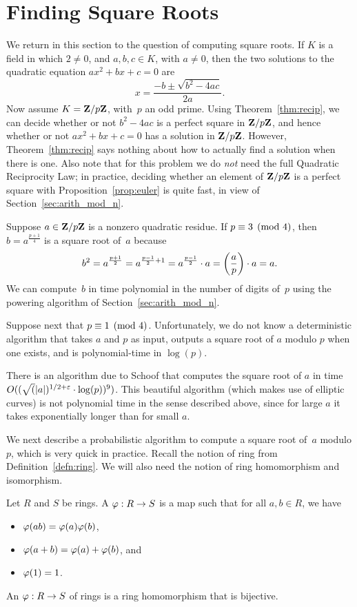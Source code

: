 \section{Finding Square Roots}\label{sec:findingsqrt}
We return in this section to the question of computing square roots.
If $K$ is a field in which $2\neq 0$, and $a,b,c\in K$, with $a\neq 0$,
then
the two solutions to the quadratic equation $ax^2+bx+c=0$ are
$$
x = \frac{-b\pm \sqrt{b^2-4ac}}{2a}.
$$
Now assume $K=\mathbf{Z}/p\mathbf{Z}{}$, with~$p$ an odd prime.  Using
Theorem~\ref{thm:recip}, we can decide whether or not $b^2-4ac$ is a
perfect square in $\mathbf{Z}/p\mathbf{Z}{}$, and hence whether or not $ax^2 + bx+c=0$
has a solution in $\mathbf{Z}/p\mathbf{Z}{}$.  However,
Theorem~\ref{thm:recip} says nothing about how to actually find
a solution when there is one.
Also note that for this problem we do {\em not} need the
full Quadratic Reciprocity Law; in practice,
deciding whether an element of $\mathbf{Z}/p\mathbf{Z}{}$ is
a perfect square with Proposition~\ref{prop:euler} is quite fast,
in view of Section~\ref{sec:arith_mod_n}.

Suppose $a\in \mathbf{Z}/p\mathbf{Z}{}$ is a nonzero quadratic residue.
If $p\equiv 3 \pmod{4}$, then $b=a^{\frac{p+1}{4}}$
is a square root of~$a$ because
$$
  b^2 = a^{\frac{p+1}{2}} = a^{\frac{p-1}{2} + 1}
     = a^{\frac{p-1}{2}} \cdot a
          = \left(\frac{a}{p}\right) \cdot a = a.
$$
We can compute~$b$ in time polynomial in the number of digits of~$p$
using the powering algorithm of Section~\ref{sec:arith_mod_n}.


Suppose next that $p\equiv 1\pmod{4}$.
Unfortunately, we do not know a deterministic algorithm
that takes $a$ and $p$ as input, outputs
a square root of $a$ modulo $p$ when one exists,
and is polynomial-time in $\log(p)$.

\begin{remark}
  There is an algorithm due to Schoof \cite{schoof:sqrt} that computes
  the square root of $a$ in time $O((\sqrt(|a|)^{1/2 + \varepsilon} \cdot
  \log(p))^9)$.  This beautiful algorithm (which makes use of elliptic
  curves) is not polynomial time in the sense described above, since
  for large $a$ it takes exponentially longer than for small $a$.
\end{remark}

We next describe a probabilistic algorithm to
compute a square root of~$a$ modulo $p$, which is very quick
in practice.
Recall the notion of ring from Definition~\ref{defn:ring}.
We will also need the notion of ring homomorphism and isomorphism.
\begin{definition}
Let $R$ and $S$ be rings.
A  $\varphi:R\to S$
is a map such that for all $a,b\in R$, we have
\begin{itemize}
\item $\varphi(ab) =\varphi(a)\varphi(b)$,
\item $\varphi(a+b) = \varphi(a) + \varphi(b)$, and
\item $\varphi(1) = 1$.
\end{itemize}
An  $\varphi:R\to S$ of rings is a
ring homomorphism that is bijective.
\end{definition}


